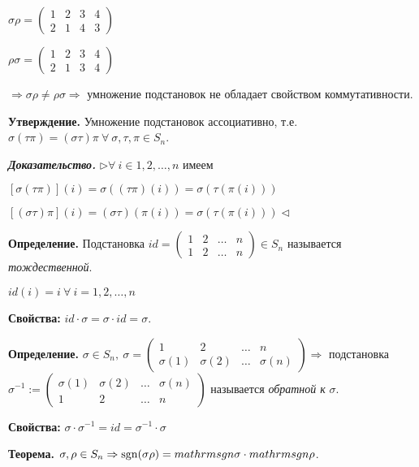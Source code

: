 $\sigma \rho = \begin{pmatrix} 1 & 2 & 3 & 4 \\ 2 & 1 & 4 & 3 \end{pmatrix}$

$\rho \sigma = \begin{pmatrix} 1 & 2 & 3 & 4 \\ 2 & 1 & 3 & 4 \end{pmatrix}$

$\Rightarrow \sigma \rho \neq \rho \sigma \Rightarrow$ умножение подстановок не обладает свойством коммутативности.

\bigskip
\textbf{Утверждение.} Умножение подстановок ассоциативно, т.е. $\sigma (\tau \pi) = (\sigma \tau) \pi \ \forall \ \sigma, \tau, \pi \in S_n$. 

\bigskip
\textbf{\textit{Доказательство.}} $\rhd \forall \ i \in 1, 2, \dots, n$ имеем

$[\sigma (\tau \pi)](i) = \sigma ((\tau \pi)(i)) = \sigma (\tau (\pi (i)))$

$[(\sigma \tau) \pi] (i) = (\sigma \tau) (\pi(i)) = \sigma (\tau (\pi(i))) \lhd$

\bigskip
\textbf{Определение.} Подстановка $id = \begin{pmatrix} 1 & 2 & \dots & n \\ 1 & 2 & \dots & n \end{pmatrix} \in S_n$ называется \textit{тождественной}.

$id(i) = i \ \forall \ i=1, 2, \dots, n$

\bigskip
\textbf{Свойства:} $id \cdot \sigma = \sigma \cdot id = \sigma$.

\bigskip
\textbf{Определение.} $\sigma \in S_n, \ \sigma = \begin{pmatrix} 1 & 2 & \dots & n \\ \sigma (1) & \sigma (2) & \dots & \sigma (n) \end{pmatrix} \Rightarrow$ подстановка $\sigma^{-1} := \begin{pmatrix} \sigma (1) & \sigma (2) & \dots & \sigma (n) \\ 1 & 2 & \dots & n \end{pmatrix}$ называется \textit{обратной к} $\sigma$.

\bigskip
\textbf{Свойства:} $\sigma \cdot \sigma^{-1} = id = \sigma^{-1} \cdot \sigma$

\bigskip
\textbf{Теорема.} $\sigma, \rho \in S_n \Rightarrow \mathrm{sgn}(\sigma \rho) = \\mathrm{sgn} \sigma \cdot \\mathrm{sgn} \rho$.

